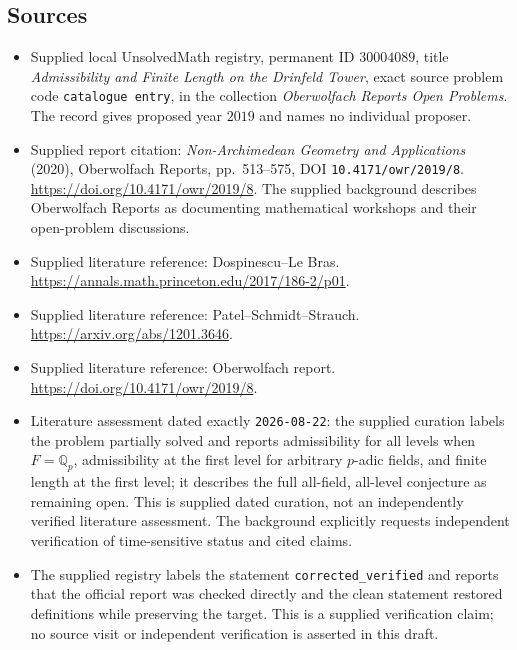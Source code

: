 \documentclass[11pt]{article}
\newcommand{\Q}{\mathbb{Q}}
\begin{document}
\subsection{Sources}
\begin{itemize}
\item Supplied local UnsolvedMath registry, permanent ID \(30004089\), title \emph{Admissibility and Finite Length on the Drinfeld Tower}, exact source problem code \texttt{catalogue entry}, in the collection \emph{Oberwolfach Reports Open Problems}. The record gives proposed year \(2019\) and names no individual proposer.
\item Supplied report citation: \emph{Non-Archimedean Geometry and Applications} (2020), Oberwolfach Reports, pp.~513--575, DOI \texttt{10.4171/owr/2019/8}. \url{https://doi.org/10.4171/owr/2019/8}. The supplied background describes Oberwolfach Reports as documenting mathematical workshops and their open-problem discussions.
\item Supplied literature reference: Dospinescu--Le Bras. \url{https://annals.math.princeton.edu/2017/186-2/p01}.
\item Supplied literature reference: Patel--Schmidt--Strauch. \url{https://arxiv.org/abs/1201.3646}.
\item Supplied literature reference: Oberwolfach report. \url{https://doi.org/10.4171/owr/2019/8}.
\item Literature assessment dated exactly \texttt{2026-08-22}: the supplied curation labels the problem partially solved and reports admissibility for all levels when \(F=\Q_p\), admissibility at the first level for arbitrary \(p\)-adic fields, and finite length at the first level; it describes the full all-field, all-level conjecture as remaining open. This is supplied dated curation, not an independently verified literature assessment. The background explicitly requests independent verification of time-sensitive status and cited claims.
\item The supplied registry labels the statement \texttt{corrected\_verified} and reports that the official report was checked directly and the clean statement restored definitions while preserving the target. This is a supplied verification claim; no source visit or independent verification is asserted in this draft.
\end{itemize}
\end{document}
